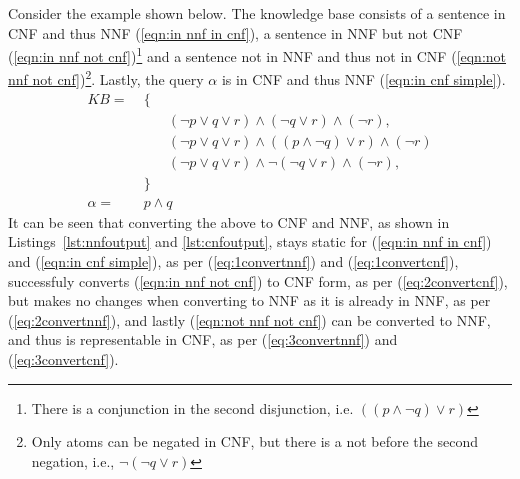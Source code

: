 Consider the example shown below. The knowledge base consists of a sentence in
CNF and thus NNF (\ref{eqn:in nnf in cnf}), a sentence in NNF but not CNF
(\ref{eqn:in nnf not cnf})\footnote{There is a conjunction in the second disjunction, i.e. $((p\wedge\neg q) \vee r)$}
and a sentence not in NNF and thus not in CNF (\ref{eqn:not nnf not cnf})\footnote{Only atoms can be negated in CNF, but there is a not before the second negation, i.e., $\neg (\neg q \vee r)$}.
Lastly, the query $\alpha$ is in CNF and thus NNF (\ref{eqn:in cnf simple}).
\begin{align}
    KB =& \; \{                                                                         \nonumber                     \\
        & \qquad (\neg p \vee q \vee r)\wedge(\neg q \vee r)\wedge(\neg r),             \label{eqn:in nnf in cnf}     \\
        & \qquad (\neg p \vee q \vee r)\wedge((p\wedge\neg q) \vee r)\wedge(\neg r)     \label{eqn:in nnf not cnf}    \\
        & \qquad (\neg p \vee q \vee r)\wedge\neg (\neg q \vee r)\wedge(\neg r),        \label{eqn:not nnf not cnf}   \\
        & \; \}                                                                         \nonumber                     \\
\alpha =& \; p \wedge q                                                                 \label{eqn:in cnf simple}
\end{align}
It can be seen that converting the above to CNF and NNF, as shown in Listings~\ref{lst:nnfoutput} and
\ref{lst:cnfoutput}, stays static for (\ref{eqn:in nnf in cnf}) and (\ref{eqn:in cnf simple}), as per (\ref{eq:1convertnnf}) and (\ref{eq:1convertcnf}),
successfuly converts (\ref{eqn:in nnf not cnf}) to CNF form, as per (\ref{eq:2convertcnf}), but makes no changes
when converting to NNF as it is already in NNF, as per (\ref{eq:2convertnnf}), and lastly (\ref{eqn:not nnf not cnf})
can be converted to NNF, and thus is representable in CNF, as per (\ref{eq:3convertnnf}) and (\ref{eq:3convertcnf}).
